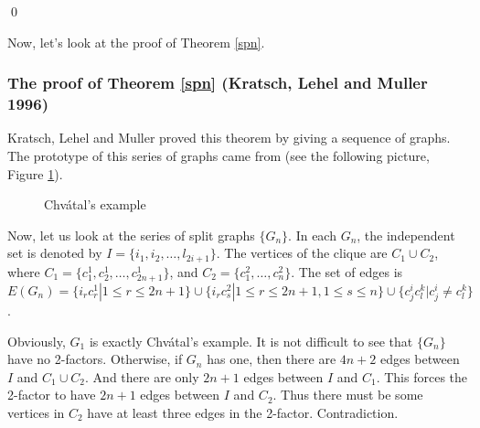 \documentclass[12pt]{report}
\begin{document}
\qed


Now, let's look at the proof of Theorem \ref{spn}.

\subsubsection{The proof of Theorem \ref{spn} (Kratsch, Lehel and Muller 1996)}
Kratsch, Lehel and Muller proved this theorem by giving a sequence of graphs. The prototype of this series of graphs came from \cite{chvatal1973tough} (see the following picture, Figure \ref{orispl}).


\begin{figure}[h]
\begin{center}
\end{center}
\caption{Chv{\'a}tal's example}\label{orispl}
\end{figure}
\newpage




Now, let us look at the series of split graphs $\{G_n\}$. In each $G_n$, the independent set is denoted by $I=\{i_1,i_2,\ldots,l_{2i+1}\}$. The vertices of the clique are $C_1\cup C_2$, where $C_1=\{c^1_1,c^1_2,\ldots,c^1_{2n+1}\}$, and $C_2=\{c^2_1,\ldots,c^2_n\}$. The set of edges is $E(G_n)=\{i_rc^1_r|1\le r\le 2n+1\}\cup\{i_rc^2_s|1\le r\le 2n+1,1\le s\le n\}\cup\{c^i_jc^k_l|c^i_j\neq c^k_l\}$.

Obviously, $G_1$ is exactly Chv{\'a}tal's example. It is not difficult to see that $\{G_n\}$ have no 2-factors. Otherwise, if $G_n$ has one, then there are $4n+2$ edges between $I$ and $C_1\cup C_2$. And there are only $2n+1$ edges between $I$ and $C_1$. This forces the 2-factor to have  $2n+1$ edges between $I$ and $C_2$. Thus there must be some vertices in $C_2$ have at least three edges in the 2-factor. Contradiction.
\end{document}
